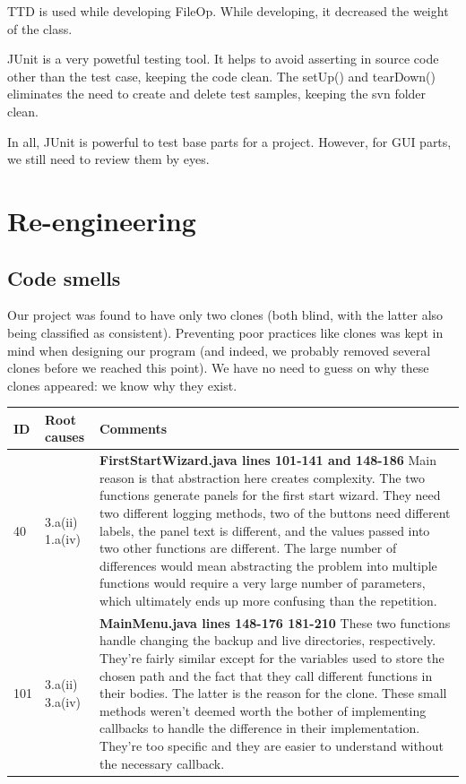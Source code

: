 \documentclass[12pt,a4paper]{article}
\newcommand\tablepar{\vspace{0.25cm}\newline}
\begin{document}
TTD is used while developing FileOp.  While developing, it decreased the weight of the class.

JUnit is a very powetful testing tool. It helps to avoid asserting in source code other than the test case, keeping the code clean. The setUp() and tearDown() eliminates the need to create and delete test samples, keeping the svn folder clean.

In all, JUnit is powerful to test base parts for a project. However, for GUI parts, we still need to review them by eyes.


\section{Re-engineering}

\subsection{Code smells}
Our project was found to have only two clones (both blind, with the latter also being classified as consistent). Preventing poor practices like clones was kept in mind when designing our program (and indeed, we probably removed several clones before we reached this point). We have no need to guess on why these clones appeared: we know why they exist.

\begin{longtable}{| p{1.5cm} | p{1.25cm} | p{12cm} |}
  \hline
  \textbf{ID} & \textbf{Root causes} & \textbf{Comments} \\ \hline
  40 \newline
  42 & 
  3.a(ii) \newline
  1.a(iv) &
  \textbf{FirstStartWizard.java lines 101-141 and 148-186} \tablepar
  Main reason is that abstraction here creates complexity. The two functions generate panels for the first start wizard. They need two different logging methods, two of the buttons need different labels, the panel text is different, and the values passed into two other functions are different. \tablepar
 The large number of differences would mean abstracting the problem into multiple functions would require a very large number of parameters, which ultimately ends up more confusing than the repetition. \\ \hline
 101 \newline
 102 &
 3.a(ii) \newline
 3.a(iv) &
 \textbf{MainMenu.java lines 148-176 181-210} \tablepar
 These two functions handle changing the backup and live directories, respectively. They're fairly similar except for the variables used to store the chosen path and the fact that they call different functions in their bodies. The latter is the reason for the clone. \tablepar
 These small methods weren't deemed worth the bother of implementing callbacks to handle the difference in their implementation. They're too specific and they are easier to understand without the necessary callback. \\ \hline
\end{longtable}
\end{document}
